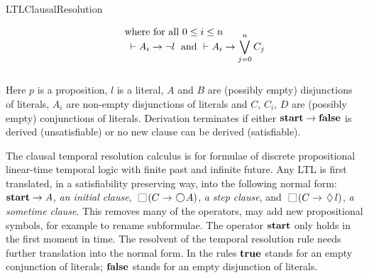 \begin{entry}{LTLClausalResolution}
\begin{calculus}
\[\begin{array}{c}
\begin{array}[b]{ll}
& \quad
\begin{array}{l}
\text{where for all } 0 \leq i \leq n \\[-5pt]
\mbox{}\;\vdash A_i \rightarrow \neg l \; \text{ and }
\vdash A_i \rightarrow \displaystyle \bigvee_{j=0}^n C_j
\vspace*{0.9em}
\end{array}
\end{array}
\end{array}
\]

\vspace*{-1em}
Here $p$ is a proposition, $l$ is a literal, $A$ and $B$ are (possibly empty) disjunctions of literals,
$A_i$ are non-empty disjunctions of literals and 
$C$, $C_i$, $D$ are (possibly empty) conjunctions of literals. 
Derivation terminates if either ${\bf start}\rightarrow{\bf false}$ is derived (unsatisfiable) or no new clause can be derived (satisfiable).  
\end{calculus}


 \begin{clarifications}
The clausal temporal resolution calculus is for formulae of discrete propositional
linear-time temporal logic with finite past and infinite future.
Any LTL is first translated, in a satisfiability preserving way, into the
following  normal form: 
${\bf start} \rightarrow A$, {\em an initial clause},
$ \Always (C \rightarrow  \Next A)$, {\em a step clause}, and
$\Always  (C   \rightarrow  \sometime l)$, {\em a sometime clause}.
%
This removes many of the operators, may add new propositional 
symbols, for example to rename subformulae.
%
The operator ${\bf start}$ only holds in the first moment in time. 
%
The resolvent of the temporal resolution rule needs further translation into
the normal form. 
%
In the rules ${\bf true}$ stands for an empty conjunction of literals; ${\bf false}$
stands for an empty disjunction of literals.
 \end{clarifications}


\end{entry}
